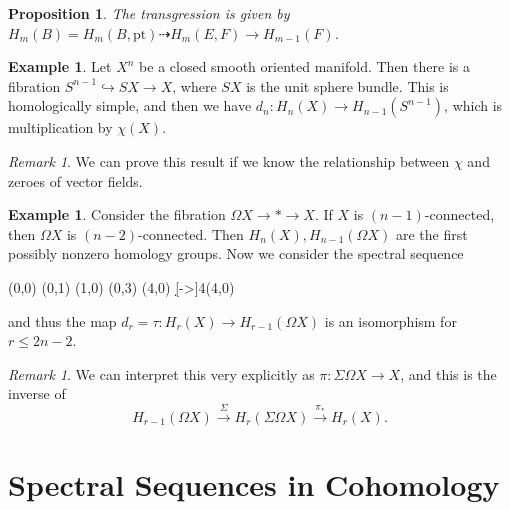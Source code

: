 \documentclass[leqno, openany]{memoir}
\newtheorem{prop}[thm]{Proposition}
\theoremstyle{definition}
\newtheorem{exm}[thm]{Example}
\theoremstyle{remark}
\newtheorem{rmk}[thm]{Remark}
\theoremstyle{plain}
\theoremstyle{definition}
\theoremstyle{remark}
\newcommand{\Z}{\mathbb{Z}}
\newcommand{\mr}[1]{\mathrm{#1}}
\begin{document}
\begin{prop}
    The transgression is given by $H_m(B) = H_m(B, \mr{pt}) \dashrightarrow H_m(E, F) \to H_{m-1}(F)$.
\end{prop}

\begin{exm}
    Let $X^n$ be a closed smooth oriented manifold. Then there is a fibration $S^{n-1} \hookrightarrow SX \to X$, where $SX$ is the unit sphere bundle. This is homologically simple, and then we have $d_n \colon H_n(X) \to H_{n-1}(S^{n-1})$, which is multiplication by $\chi(X)$.
\end{exm}

\begin{rmk}
    We can prove this result if we know the relationship between $\chi$ and zeroes of vector fields.
\end{rmk}

\begin{exm}
    Consider the fibration $\Omega X \to * \to X$. If $X$ is $(n-1)$-connected, then $\Omega X$ is $(n-2)$-connected. Then $H_n(X), H_{n-1}(\Omega X)$ are the first possibly nonzero homology groups. Now we consider the spectral sequence
    \begin{center}
    \begin{sseqdata}[name=lol,homological Serre grading, classes = {draw=none}, y axis gap = 3em]
        \class["\Z"](0,0)
        \class(0,1)
        \class(1,0)
        \class["H_{n-1}(\Omega X)"](0,3)
        \class["H_n(X)"](4,0)
        \d[->]4(4,0)
    \end{sseqdata}
    \printpage[name=lol,page=4, grid=chess]
    \end{center}
    and thus the map $d_r = \tau \colon H_r(X) \to H_{r-1}(\Omega X)$ is an isomorphism for $r \leq 2n-2$.
\end{exm}

\begin{rmk}
    We can interpret this very explicitly as $\pi \colon \Sigma \Omega X \to X$, and this is the inverse of
    \[ H_{r-1}(\Omega X) \xrightarrow{\Sigma} H_r(\Sigma \Omega X) \xrightarrow{\pi_*} H_r(X). \]
\end{rmk}

\section{Spectral Sequences in Cohomology}%
\label{sec:spectral_sequences_in_cohomology}
\end{document}
